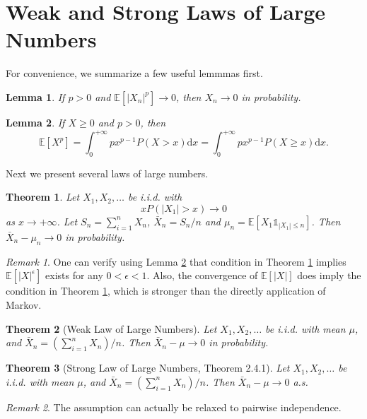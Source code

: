 \documentclass[openany]{book}
\newtheorem{lemma}{Lemma}[chapter]
\newtheorem{theorem}{Theorem}[chapter]
\theoremstyle{definition}
\theoremstyle{remark}
\newtheorem*{remark}{Remark}
\begin{document}
\section{Weak and Strong Laws of Large Numbers}
For convenience, we summarize a few useful lemmmas first.
\begin{lemma}
    If $p>0$ and $\mathbb{E}\left[|X_n|^p\right]\to0$, then $X_n\to0$ in probability.
\end{lemma}
\begin{lemma}\label{lem:momentFubini}
    If $X\ge0$ and $p>0$, then
    \begin{equation*}
        \mathbb{E}[X^p]=\int_0^{+\infty}px^{p-1}P(X>x)\mathrm{d}x=\int_0^{+\infty}px^{p-1}P(X\ge x)\mathrm{d}x.
    \end{equation*}
\end{lemma}

Next we present several laws of large numbers.
\begin{theorem}\label{thm:generalWeakLaw}
    Let $X_1,X_2,\ldots$ be i.i.d. with
    \begin{equation*}
        xP\left(|X_1|>x\right)\to0
    \end{equation*}
    as $x\to+\infty$. Let $S_n=\sum_{i=1}^{n}X_n$, $\bar{X}_n=S_n/n$ and $\mu_n=\mathbb{E}\left[X_1\mathds{1}_{|X_1|\le n}\right]$. Then $\bar{X}_n-\mu_n\to0$ in probability.
\end{theorem}
\begin{remark}
    One can verify using Lemma \ref{lem:momentFubini} that condition in Theorem \ref{thm:generalWeakLaw} implies $\mathbb{E}\left[|X|^{\epsilon}\right]$ exists for any $0<\epsilon<1$. Also, the convergence of $\mathbb{E}\left[|X|\right]$ does imply the condition in Theorem \ref{thm:generalWeakLaw}, which is stronger than the directly application of Markov.
\end{remark}
\begin{theorem}[Weak Law of Large Numbers]\label{thm:weakLaw}
    Let $X_1,X_2,\ldots$ be i.i.d. with mean $\mu$, and $\bar{X}_n=\left(\sum_{i=1}^{n}X_n\right)/n$. Then $\bar{X}_n-\mu\to0$ in probability.
\end{theorem}
\begin{theorem}[Strong Law of Large Numbers, \cite{D10} Theorem 2.4.1]\label{thm:strongLaw}
    Let $X_1,X_2,\ldots$ be i.i.d. with mean $\mu$, and $\bar{X}_n=\left(\sum_{i=1}^{n}X_n\right)/n$. Then $\bar{X}_n-\mu\to0$ a.s.
\end{theorem}
\begin{remark}
    The assumption can actually be relaxed to pairwise independence.
\end{remark}
\end{document}
